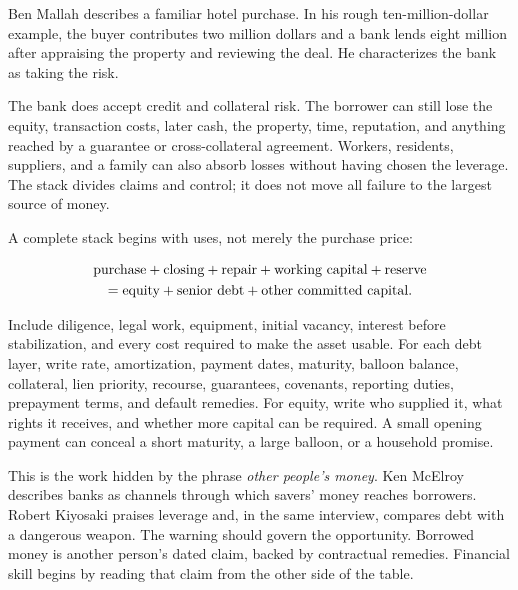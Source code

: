 Ben Mallah describes a familiar hotel purchase. In his rough
ten-million-dollar example, the buyer contributes two million dollars and a
bank lends eight million after appraising the property and reviewing the deal.
He characterizes the bank as taking the risk.

The bank does accept credit and collateral risk. The borrower can still lose
the equity, transaction costs, later cash, the property, time, reputation, and
anything reached by a guarantee or cross-collateral agreement. Workers,
residents, suppliers, and a family can also absorb losses without having chosen
the leverage. The stack divides claims and control; it does not move all
failure to the largest source of money.

A complete stack begins with uses, not merely the purchase price:

\begin{equation}
\ifdim\paperwidth<450pt
\begin{aligned}
&\text{purchase}+\text{closing}+\text{repair}\\
&\quad+\text{working capital}+\text{reserve}\\
={}&\text{equity}+\text{senior debt}\\
&\quad+\text{other committed capital}.
\end{aligned}
\else
\begin{gathered}
\text{purchase}+\text{closing}+\text{repair}+\text{working capital}
 +\text{reserve}\\
=\text{equity}+\text{senior debt}+\text{other committed capital}.
\end{gathered}
\fi
\end{equation}

Include diligence, legal work, equipment, initial vacancy, interest before
stabilization, and every cost required to make the asset usable. For each debt
layer, write rate, amortization, payment dates, maturity, balloon balance,
collateral, lien priority, recourse, guarantees, covenants, reporting duties,
prepayment terms, and default remedies. For equity, write who supplied it, what
rights it receives, and whether more capital can be required. A small opening
payment can conceal a short maturity, a large balloon, or a household promise.

This is the work hidden by the phrase \emph{other people's money}. Ken McElroy
describes banks as channels through which savers' money reaches borrowers.
Robert Kiyosaki praises leverage and, in the same interview, compares debt with
a dangerous weapon. The warning should govern the opportunity. Borrowed money
is another person's dated claim, backed by contractual remedies. Financial
skill begins by reading that claim from the other side of the table.

